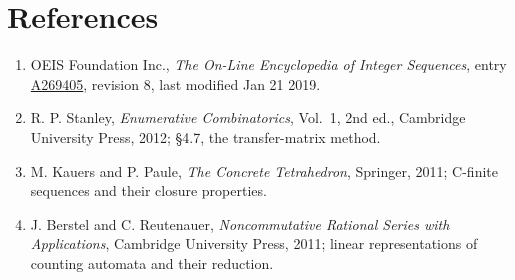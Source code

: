 \documentclass[11pt]{article}
\theoremstyle{definition}
\begin{document}
\section{References}

\begin{enumerate}

\item OEIS Foundation Inc., \emph{The On-Line Encyclopedia of Integer Sequences}, entry \href{https://oeis.org/A269405}{A269405}, revision 8, last modified Jan 21 2019.

\item R. P. Stanley, \emph{Enumerative Combinatorics}, Vol.~1, 2nd ed., Cambridge University Press, 2012; \S4.7, the transfer-matrix method.

\item M. Kauers and P. Paule, \emph{The Concrete Tetrahedron}, Springer, 2011; C-finite sequences and their closure properties.

\item J. Berstel and C. Reutenauer, \emph{Noncommutative Rational Series with Applications}, Cambridge University Press, 2011; linear representations of counting automata and their reduction.

\end{enumerate}
\end{document}
